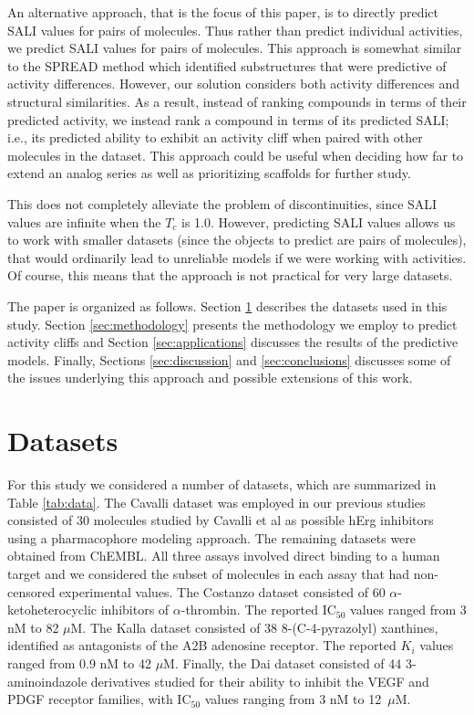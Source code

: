 \documentclass[letterpaper, 12pt]{article}
\begin{document}
An alternative approach, that is the focus of this paper, is to directly predict SALI values for
pairs of molecules. Thus rather than predict individual activities, we predict SALI values for pairs
of molecules. This approach is somewhat similar to the SPREAD method \cite{Scheiber:2009fk} which
identified substructures that were predictive of activity differences. However, our solution
considers both activity differences and structural similarities. As a result, instead of ranking
compounds in terms of their predicted activity, we instead rank a compound in terms of its predicted
SALI; i.e., its predicted ability to exhibit an activity cliff when paired with other molecules in
the dataset. This approach could be useful when deciding how far to extend an analog series as well
as prioritizing scaffolds for further study.

This does not completely alleviate the problem of discontinuities, since SALI values are infinite
when the $T_c$ is 1.0.  However, predicting SALI values allows us to work with smaller datasets
(since the objects to predict are pairs of molecules), that would ordinarily lead to unreliable
models if we were working with activities. Of course, this means that the approach is not practical
for very large datasets.


The paper is organized as follows. Section \ref{sec:datasets} describes the datasets used in this
study. Section \ref{sec:methodology} presents the methodology we employ to predict activity cliffs
and Section \ref{sec:applications} discusses the results of the predictive models. Finally, Sections
\ref{sec:discussion} and \ref{sec:conclusions} discusses some of the issues underlying this approach
and possible extensions of this work.

\section{Datasets}            
\label{sec:datasets}
For this study we considered a number of datasets, which are summarized in Table \ref{tab:data}. The
Cavalli dataset was employed in our previous studies consisted of 30 molecules studied by Cavalli et
al\cite{Cavalli:2002aa} as possible hErg inhibitors using a pharmacophore modeling approach. The
remaining datasets were obtained from ChEMBL. All three assays involved direct binding to a human
target and we considered the subset of molecules in each assay that had non-censored experimental
values. The Costanzo dataset\cite{Costanzo:2005uq} consisted of 60 $\alpha$-ketoheterocyclic
inhibitors of $\alpha$-thrombin. The reported $\mathrm{IC_{50}}$ values ranged from 3 nM to 82
$\mu$M. The Kalla dataset\cite{Kalla:2006kx} consisted of 38 8-(C-4-pyrazolyl) xanthines, identified
as antagonists of the A2B adenosine receptor. The reported $K_i$ values ranged from 0.9 nM to 42
$\mu$M. Finally, the Dai dataset\cite{Dai:2007kl} consisted of 44 3-aminoindazole derivatives
studied for their ability to inhibit the VEGF and PDGF receptor families, with $\mathrm{IC_{50}}$
values ranging from 3 nM to 12~$\mu$M.
\end{document}
